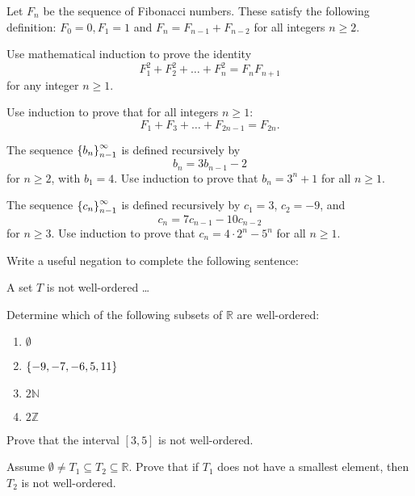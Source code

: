\documentclass[12pt]{article}
\begin{document}
Let $F_n$ be the sequence of Fibonacci numbers. These satisfy the following definition: 
$F_0=0, F_1=1$ and $F_n=F_{n-1}+F_{n-2}$ for all integers $n\geq 2$.

\begin{qu}
 Use mathematical induction to prove the identity
 $$F_1^2+F_2^2 + \dots + F_n^2 = F_n F_{n+1}$$
 for any integer $n \geq 1$.
\end{qu}

\begin{qu}
Use induction to prove that for all integers $n\geq 1$:
$$F_1+F_3+\dots +F_{2n-1} = F_{2n}.$$
\end{qu}

\begin{qu}
The sequence $\left\{b_n\right\}_{n-1}^\infty$ is defined recursively by 
$$b_n=3b_{n-1}-2$$
for $n\geq 2$, with $b_1=4$. Use induction to prove that $b_n=3^n+1$ for all $n\geq 1$.
\end{qu}

\begin{qu}
The sequence $\left\{c_n\right\}_{n-1}^\infty$ is defined recursively by $c_1=3$, $c_2=-9$, and
$$c_n=7c_{n-1}-10c_{n-2}$$
for $n\geq 3$. Use induction to prove that $c_n=4\cdot 2^n-5^n$ for all $n\geq 1$.
\end{qu}

\begin{qu} Write a useful negation to complete the following sentence:

A set $T$ is not well-ordered  \ldots
\vspace*{12pt}
\end{qu}

\begin{qu} Determine which of the following subsets of $\mathbb{R}$ are well-ordered:
\begin{enumerate}[label=\alph*)]
\item $\emptyset$
\item $\left\{-9, -7, -6, 5, 11\right\}$
\item $2\mathbb{N}$
\item $2\mathbb{Z}$
\end{enumerate}
\end{qu}

\begin{qu} Prove that the interval $[3,5]$ is not well-ordered. \end{qu}

\begin{qu}
Assume $\emptyset \ne T_1 \subseteq T_2 \subseteq \mathbb{R}$. Prove that if $T_1$ does not have a smallest element, then $T_2$ is not well-ordered.
\end{qu}
\end{document}
